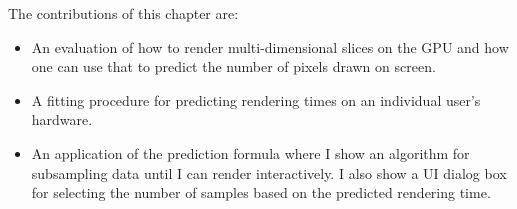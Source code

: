 The contributions of this chapter are:

\begin{itemize}

\item An evaluation of how to render multi-dimensional slices on the GPU 
      and how one can use that to predict the number of pixels drawn on screen.

\item A fitting procedure for predicting rendering times on an
 individual user's hardware.

\item An application of the prediction formula where I show an algorithm
	  for subsampling data until I can render interactively.  I also 
	  show a UI dialog box for selecting the number of samples based on
	  the predicted rendering time.


\end{itemize}

